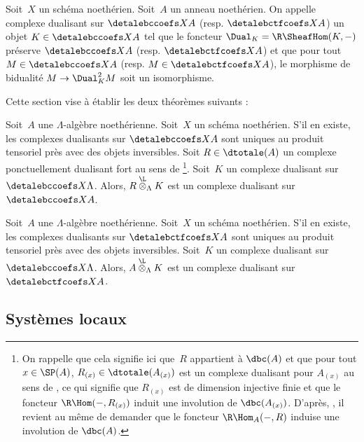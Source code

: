 \documentclass[10pt]{../fichiers-configuration-latex/smfart}
\begin{document}
\begin{definition2}
Soit $X$ un schéma noethérien. Soit $A$ un anneau noethérien. On appelle
complexe dualisant sur $\detalebccoefs X A$ (resp. $\detalebctfcoefs X A$)
un objet $K\in\detalebccoefs X A$ tel
que le foncteur $\Dual_K=\R\SheafHom(K,-)$ préserve $\detalebccoefs X A$
(resp. $\detalebctfcoefs X A$)
et que pour tout $M\in\detalebccoefs X A$ (resp. $M\in\detalebctfcoefs X A$),
le morphisme de bidualité $M\to \Dual^2_K M$ soit un isomorphisme.
\end{definition2}

Cette section vise à établir les deux théorèmes suivants :

\begin{theoreme2}\label{17-theoreme-dualite-d-b-c-coefficients}
Soit $A$ une $\Lambda$-algèbre noethérienne. Soit $X$ un schéma
noethérien. S'il en existe, les complexes dualisants sur $\detalebccoefs X A$
sont uniques au produit tensoriel près avec des objets inversibles.
Soit $R\in\dtotale(A)$ un complexe ponctuellement
dualisant fort au sens de \cite[page~120]{GDBC@Conrad}\;\footnote{On rappelle
que cela signifie ici que $R$ appartient à
$\dbc(A)$ et que pour tout $x\in \SP(A)$,
$R_{(x)}\in\dtotale(A_{(x)})$ est un complexe dualisant pour $A_{(x)}$ au sens
de \cite[page~258]{RD@Hartshorne}, ce qui signifie que $R_{(x)}$ est de
dimension injective finie et que le foncteur
$\R\Hom(-,R_{(x)})$ induit une involution de
$\dbc(A_{(x)})$. D'après,
\cite[lemma~3.1.5]{GDBC@Conrad}, il revient au même de demander que le foncteur
$\R\Hom_A(-,R)$ induise une involution de
$\dbc(A)$.}.
Soit $K$ un complexe dualisant sur $\detalebccoefs X \Lambda$. Alors,
$R\overset{\L}\otimes_{\Lambda} K$ est un complexe dualisant sur
$\detalebccoefs
X A$.
\end{theoreme2}

\begin{theoreme2}\label{17-theoreme-dualite-d-b-ctf-coefficients}
Soit $A$ une $\Lambda$-algèbre noethérienne. Soit $X$ un schéma
noethérien. S'il en existe, les
complexes dualisants sur $\detalebctfcoefs X A$ sont uniques au produit
tensoriel près avec des objets inversibles.
Soit $K$ un complexe dualisant sur $\detalebccoefs X \Lambda$.
Alors, $A\overset{\L}\otimes_{\Lambda} K$ est un complexe dualisant sur
$\detalebctfcoefs X A$.
\end{theoreme2}

\subsection{Systèmes locaux}%
\label{17-subsection-systemes-locaux}
\end{document}
